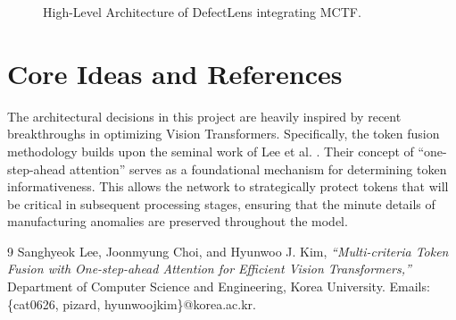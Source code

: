 \documentclass[12pt]{article}
\begin{document}
\begin{figure}[htpb]
    \centering
    \caption{High-Level Architecture of DefectLens integrating MCTF.}
    \label{fig:architecture}
\end{figure}

\section{Core Ideas and References}
The architectural decisions in this project are heavily inspired by recent breakthroughs in optimizing Vision Transformers. Specifically, the token fusion methodology builds upon the seminal work of Lee et al. \cite{lee2023multi}. Their concept of ``one-step-ahead attention'' serves as a foundational mechanism for determining token informativeness. This allows the network to strategically protect tokens that will be critical in subsequent processing stages, ensuring that the minute details of manufacturing anomalies are preserved throughout the model.

\begin{thebibliography}{9}
Sanghyeok Lee, Joonmyung Choi, and Hyunwoo J. Kim,
\textit{``Multi-criteria Token Fusion with One-step-ahead Attention for Efficient Vision Transformers,''}
Department of Computer Science and Engineering, Korea University.
Emails: \{cat0626, pizard, hyunwoojkim\}@korea.ac.kr.
\end{thebibliography}
\end{document}
